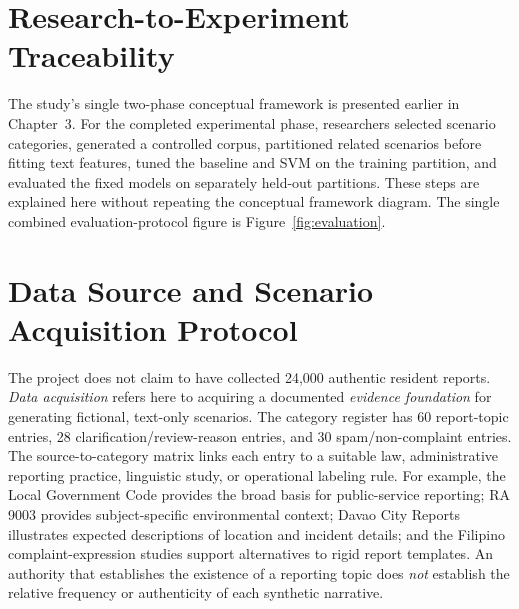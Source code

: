 \section{Research-to-Experiment Traceability}
The study's single two-phase conceptual framework is presented earlier in Chapter~3. For the completed experimental phase, researchers selected scenario categories, generated a controlled corpus, partitioned related scenarios before fitting text features, tuned the baseline and SVM on the training partition, and evaluated the fixed models on separately held-out partitions. These steps are explained here without repeating the conceptual framework diagram. The single combined evaluation-protocol figure is Figure~\ref{fig:evaluation}.\par

\section{Data Source and Scenario Acquisition Protocol}
The project does not claim to have collected 24,000 authentic resident reports. \emph{Data acquisition} refers here to acquiring a documented \emph{evidence foundation} for generating fictional, text-only scenarios. The category register has 60 report-topic entries, 28 clarification/review-reason entries, and 30 spam/non-complaint entries. The source-to-category matrix links each entry to a suitable law, administrative reporting practice, linguistic study, or operational labeling rule. For example, the Local Government Code \cite{ra7160} provides the broad basis for public-service reporting; RA 9003 \cite{ra9003} provides subject-specific environmental context; Davao City Reports \cite{dcr} illustrates expected descriptions of location and incident details; and the Filipino complaint-expression studies \cite{deleon,quimbo} support alternatives to rigid report templates. An authority that establishes the existence of a reporting topic does \emph{not} establish the relative frequency or authenticity of each synthetic narrative.

